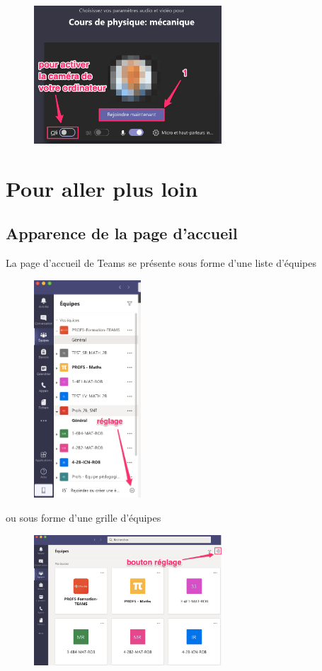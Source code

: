 \begin{figure}[H]
\includegraphics[width=7cm]{./images/teams/video2}
\centering
\end{figure}





\section{Pour aller plus loin}
\subsection{Apparence de la page d'accueil}

La page d'accueil de Teams se présente sous forme d'une liste d'équipes

\begin{figure}[H]
\includegraphics[width=4cm]{./images/teams/accueil_liste}
\centering
\end{figure}

\newpage
ou sous forme d'une grille d'équipes 

\begin{figure}[H]
\includegraphics[width=7cm]{./images/teams/accueil_grille}
\centering
\end{figure}

